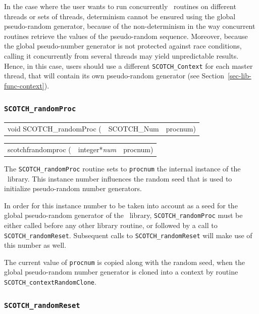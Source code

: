 In the case where the user wants to run concurrently
\libscotch\ routines on different threads or sets of threads,
determinism cannot be ensured using the global pseudo-random
generator, because of the non-determinism in the way concurrent
routines retrieve the values of the pseudo-random sequence. Moreover,
because the global pseudo-number generator is not protected against
race conditions, calling it concurrently from several threads may
yield unpredictable results. Hence, in this case, users should use a
different \texttt{SCOTCH\_\lbt Context} for each master thread, that
will contain its own pseudo-random generator (see
Section~\ref{sec-lib-func-context}).

\subsubsection{\texttt{SCOTCH\_randomProc}}

\begin{itemize}
\progsyn

{\tt\begin{tabular}{l@{}ll}
void SCOTCH\_randomProc ( & SCOTCH\_Num & procnum)
\end{tabular}}

{\tt\begin{tabular}{l@{}ll}
scotchfrandomproc ( & integer*{\it num} & procnum)
\end{tabular}}

\progdes

The \texttt{SCOTCH\_randomProc} routine sets to \texttt{procnum} the
internal instance of the \libscotch\ library. This instance number
influences the random seed that is used to initialize pseudo-random
number generators.

In order for this instance number to be taken into account as a seed
for the global pseudo-random generator of the \libscotch\ library,
\texttt{SCOTCH\_randomProc} must be either called before any other
library routine, or followed by a call to
\texttt{SCOTCH\_\lbt random\lbt Reset}. Subsequent calls to
\texttt{SCOTCH\_\lbt random\lbt Reset} will make use of this number as
well.

The current value of \texttt{procnum} is copied along with the random
seed, when the global pseudo-random number generator is cloned into a
context by routine \texttt{SCOTCH\_\lbt context\lbt Random\lbt Clone}.

\end{itemize}

\subsubsection{{\tt SCOTCH\_randomReset}}
\label{sec-lib-func-randomreset}

